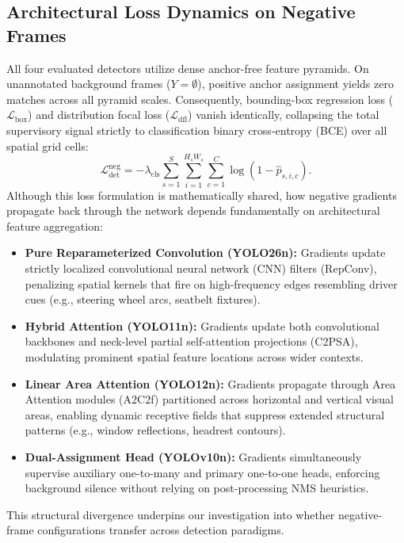 \documentclass[conference]{IEEEtran}
\begin{document}
\subsection{Architectural Loss Dynamics on Negative Frames}
\label{subsec:loss_mechanics}
All four evaluated detectors utilize dense anchor-free feature pyramids. On unannotated background frames ($Y{=}\emptyset$), positive anchor assignment yields zero matches across all pyramid scales. Consequently, bounding-box regression loss ($\mathcal{L}_{\mathrm{box}}$) and distribution focal loss ($\mathcal{L}_{\mathrm{dfl}}$) vanish identically, collapsing the total supervisory signal strictly to classification binary cross-entropy (BCE) over all spatial grid cells:
\begin{equation}
\mathcal{L}_{\mathrm{det}}^{\mathrm{neg}} = -\lambda_{\mathrm{cls}} \sum_{s=1}^S \sum_{i=1}^{H_s W_s} \sum_{c=1}^C \log\left(1 - \hat{p}_{s, i, c}\right).
\label{eq:det_neg_loss}
\end{equation}
Although this loss formulation is mathematically shared, how negative gradients propagate back through the network depends fundamentally on architectural feature aggregation:
\begin{itemize}
\item \textbf{Pure Reparameterized Convolution (YOLO26n):} Gradients update strictly localized convolutional neural network (CNN) filters (RepConv), penalizing spatial kernels that fire on high-frequency edges resembling driver cues (e.g., steering wheel arcs, seatbelt fixtures).
\item \textbf{Hybrid Attention (YOLO11n):} Gradients update both convolutional backbones and neck-level partial self-attention projections (C2PSA), modulating prominent spatial feature locations across wider contexts.
\item \textbf{Linear Area Attention (YOLO12n):} Gradients propagate through Area Attention modules (A2C2f) partitioned across horizontal and vertical visual areas, enabling dynamic receptive fields that suppress extended structural patterns (e.g., window reflections, headrest contours).
\item \textbf{Dual-Assignment Head (YOLOv10n):} Gradients simultaneously supervise auxiliary one-to-many and primary one-to-one heads, enforcing background silence without relying on post-processing NMS heuristics.
\end{itemize}
This structural divergence underpins our investigation into whether negative-frame configurations transfer across detection paradigms.
\end{document}
